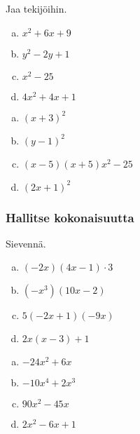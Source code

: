 \begin{tehtava}
    Jaa tekijöihin.
    \begin{enumerate}[a)]
        \item $x^2+6x+9$
        \item $y^2 - 2y+1$
        \item $x^2 -25$
        \item $4x^2 +4x +1$
    \end{enumerate}
    \begin{vastaus}
        \begin{enumerate}[a)]
        \item $(x+3)^2$
        \item $(y-1)^2$
        \item $(x-5)(x+5)x^2 -25$
        \item $(2x+1)^2$
        \end{enumerate}
    \end{vastaus}
\end{tehtava}

\subsubsection*{Hallitse kokonaisuutta}

\begin{tehtava}
    Sievennä.
    \begin{enumerate}[a)]
        \item $(-2x)(4x - 1)\cdot 3$
        \item $(-x^3)(10x - 2)$
        \item $5(-2x + 1)(-9x) $
        \item $2x(x-3)+1$
    \end{enumerate}
    \begin{vastaus}
        \begin{enumerate}[a)]
            \item $-24x^2 + 6x$
            \item $-10x^4 + 2x^3$
            \item $90x^2 - 45x$
            \item $2x^2-6x+1$
        \end{enumerate}
    \end{vastaus}
\end{tehtava}

